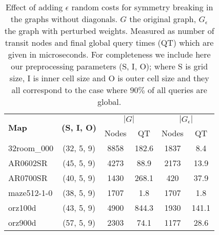 \begin{table}[tb]
\begin{center}
\begin{tabular}{|l|c|c|c|c|c|}
\hline
\multirow{2}{*}{\textbf{Map}} & \multirow{2}{*}{\textbf{(S, I, O)}} & \multicolumn{2}{|c|}{\textbf{$|G|$}} &
\multicolumn{2}{|c|}{\textbf{$|G_{\epsilon}|$}} \\ & & Nodes & QT & Nodes & QT \\
\hline
32room\_000 & (32, 5, 9) & 8858 & 182.6 & 1837 & 8.4 \\
\hline
AR0602SR & (45, 5, 9) & 4273 & 88.9 &  2173 & 13.9 \\
\hline
AR0700SR & (40, 5, 9) & 1430 & 268.1 & 420 & 37.9 \\
\hline
maze512-1-0 & (38, 5, 9) & 1707 & 1.8 & 1707 & 1.8 \\
\hline
orz100d & (43, 5, 9) & 4900 & 844.3 & 1930 & 141.1 \\
\hline
orz900d & (57, 5, 9)  & 2303 &  74.1 & 1177 & 28.6 \\
\hline
\end{tabular}
\end{center}
\caption{Effect of adding $\epsilon$ random costs for symmetry breaking in the graphs without diagonals.
 $G$ the original graph, $G_{\epsilon}$ the graph with perturbed weights. Measured as number of transit nodes and 
final global query times (QT) which are given in microseconds. For completeness we include here our
preprocessing parameters (S, I, O); where S is grid size, I is inner cell size and O is outer cell
size and they all correspond to the case where $90\%$ of all queries are global.}
\label{table:epsilon}
\end{table}
